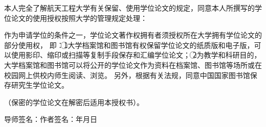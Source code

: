 \vspace{0.3cm}

\kaishu{}
\setlength{\parindent}{2em}

本人完全了解航天工程大学有关保留、使用学位论文的规定，同意本人所撰写的学位论文的使用授权按照大学的管理规定处理：

作为申请学位的条件之一，学位论文著作权拥有者须授权所在大学拥有学位论文的部分使用权，
即：\textcircled{1}大学档案馆和图书馆有权保留学位论文的纸质版和电子版，可以使用影印、缩印或扫描等复制手段保存和汇编学位论文；
\textcircled{2}为教学和科研目的，大学档案馆和图书馆可以将公开的学位论文作为资料在档案馆、图书馆等场所或在校园网上供校内师生阅读、浏览。
另外，根据有关法规，同意中国国家图书馆保存研究生学位论文。

（保密的学位论文在解密后适用本授权书）。


\vspace{0.8cm}

\begin{center}
\kaishu{}
导师签名：\qquad\qquad\qquad 作者签名：\qquad\qquad\qquad 年\qquad 月\qquad 日
\end{center}

\newpage
